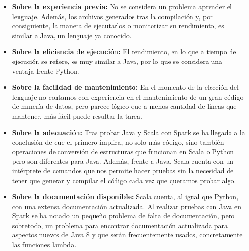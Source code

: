 \begin{itemize}
	\item \textbf{Sobre la experiencia previa:} No se considera un problema aprender el lenguaje. Además, los archivos generados tras la compilación y, por consiguiente, la manera de ejecutarlos o monitorizar su rendimiento, es similar a Java, un lenguaje ya conocido.
	\item \textbf{Sobre la eficiencia de ejecución:} El rendimiento, en lo que a tiempo de ejecución se refiere, es muy similar a Java, por lo que se considera una ventaja frente Python.
	\item \textbf{Sobre la facilidad de mantenimiento:} En el momento de la elección del lenguaje no contamos con experiencia en el mantenimiento de un gran código de minería de datos, pero parece lógico que a menos cantidad de líneas que mantener, más fácil puede resultar la tarea.	
	\item \textbf{Sobre la adecuación:} Tras probar Java y Scala con Spark se ha llegado a la conclusión de que el primero implica, no solo más código, sino también operaciones de conversión de estructuras que funcionan en Scala o Python pero son diferentes para Java. Además, frente a Java, Scala cuenta con un intérprete de comandos que nos permite hacer pruebas sin la necesidad de tener que generar y compilar el código cada vez que queramos probar algo.
	\item \textbf{Sobre la documentación disponible:} Scala cuenta, al igual que Python, con una extensa documentación actualizada. Al realizar pruebas con Java en Spark se ha notado un pequeño problema de falta de documentación, pero sobretodo, un problema para encontrar documentación actualizada para aspectos nuevos de Java 8 y que serán frecuentemente usados, concretamente las funciones lambda.
\end{itemize}

